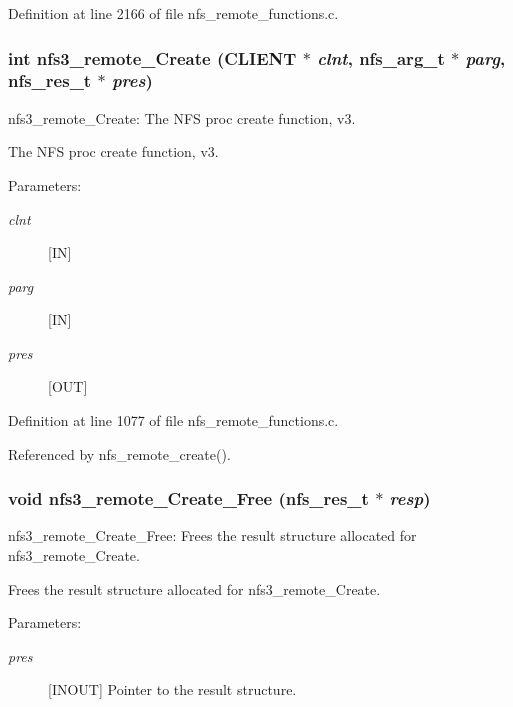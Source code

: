 Definition at line 2166 of file nfs\_\-remote\_\-functions.c.
\subsubsection{\setlength{\rightskip}{0pt plus 5cm}int nfs3\_\-remote\_\-Create (CLIENT $\ast$ {\em clnt}, nfs\_\-arg\_\-t $\ast$ {\em parg}, nfs\_\-res\_\-t $\ast$ {\em pres})}\label{group__NFSprocs_ga25}


nfs3\_\-remote\_\-Create: The NFS proc create function, v3.

The NFS proc create function, v3.

\begin{Desc}
\item[Parameters:]
\begin{description}
\item[{\em clnt}][IN] \item[{\em parg}][IN] \item[{\em pres}][OUT] \end{description}
\end{Desc}


Definition at line 1077 of file nfs\_\-remote\_\-functions.c.

Referenced by nfs\_\-remote\_\-create().
\subsubsection{\setlength{\rightskip}{0pt plus 5cm}void nfs3\_\-remote\_\-Create\_\-Free (nfs\_\-res\_\-t $\ast$ {\em resp})}\label{group__NFSprocs_ga79}


nfs3\_\-remote\_\-Create\_\-Free: Frees the result structure allocated for nfs3\_\-remote\_\-Create.

Frees the result structure allocated for nfs3\_\-remote\_\-Create.

\begin{Desc}
\item[Parameters:]
\begin{description}
\item[{\em pres}][INOUT] Pointer to the result structure. \end{description}
\end{Desc}


